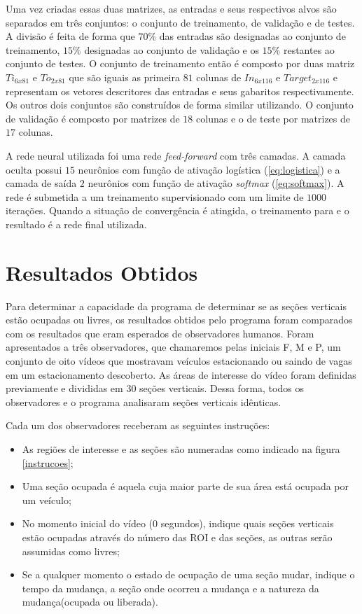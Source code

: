 Uma vez criadas essas duas matrizes, as entradas e seus respectivos alvos são separados em três conjuntos: o conjunto de treinamento, de validação e de testes. A divisão é feita de forma que $70\%$ das entradas são designadas ao conjunto de treinamento, $15\%$ designadas ao conjunto de validação e os $15\%$ restantes ao conjunto de testes. O conjunto de treinamento então é composto por duas matriz $Ti_{6x81}$ e $To_{2x81}$ que são iguais as primeira $81$ colunas de $In_{6x116}$ e $Target_{2x116}$ e representam os vetores descritores das entradas e seus gabaritos respectivamente. Os outros dois conjuntos são construídos de forma similar utilizando. O conjunto de validação é composto por matrizes de $18$ colunas e o de teste por matrizes de $17$ colunas.


A rede neural utilizada foi uma rede \textit{feed-forward} com três camadas. A camada oculta possui $15$ neurônios com função de ativação logística (\ref{eq:logistica}) e a camada de saída $2$ neurônios com função de ativação \textit{softmax} (\ref{eq:softmax}). A rede é submetida a um treinamento supervisionado com um limite de $1000$ iterações. Quando a situação de convergência é atingida, o treinamento para e o resultado é a rede final utilizada.


\section{Resultados Obtidos}

Para determinar a capacidade da programa de determinar se as seções verticais estão ocupadas ou livres, os resultados obtidos pelo programa foram comparados com os resultados que eram esperados de observadores humanos. Foram apresentados a três observadores, que chamaremos pelas iniciais F, M e P, um conjunto de oito vídeos que mostravam veículos estacionando ou saindo de vagas em um estacionamento descoberto. As áreas de interesse do vídeo foram definidas previamente e divididas em $30$ seções verticais. Dessa forma, todos os observadores e o programa analisaram seções verticais idênticas. 

Cada um dos observadores receberam as seguintes instruções:

\begin{itemize}
  \item As regiões de interesse e as seções são numeradas como indicado na figura \ref{instrucoes};
	\item Uma seção ocupada é aquela cuja maior parte de sua área está ocupada por um veículo;
	\item No momento inicial do vídeo ($0$ segundos), indique quais seções verticais estão ocupadas através do número das ROI e das seções, as outras serão assumidas como livres;
	\item Se a qualquer momento o estado de ocupação de uma seção mudar, indique o tempo da mudança, a seção onde ocorreu a mudança e a natureza da mudança(ocupada ou liberada).
\end{itemize}

